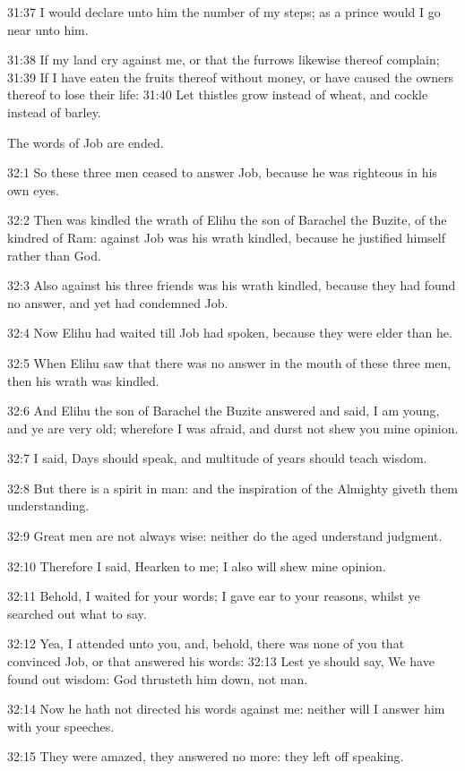 31:37 I would declare unto him the number of my steps; as a prince
would I go near unto him.

31:38 If my land cry against me, or that the furrows likewise thereof
complain; 31:39 If I have eaten the fruits thereof without money, or
have caused the owners thereof to lose their life: 31:40 Let thistles
grow instead of wheat, and cockle instead of barley.

The words of Job are ended.

32:1 So these three men ceased to answer Job, because he was righteous
in his own eyes.

32:2 Then was kindled the wrath of Elihu the son of Barachel the
Buzite, of the kindred of Ram: against Job was his wrath kindled,
because he justified himself rather than God.

32:3 Also against his three friends was his wrath kindled, because
they had found no answer, and yet had condemned Job.

32:4 Now Elihu had waited till Job had spoken, because they were elder
than he.

32:5 When Elihu saw that there was no answer in the mouth of these
three men, then his wrath was kindled.

32:6 And Elihu the son of Barachel the Buzite answered and said, I am
young, and ye are very old; wherefore I was afraid, and durst not shew
you mine opinion.

32:7 I said, Days should speak, and multitude of years should teach
wisdom.

32:8 But there is a spirit in man: and the inspiration of the Almighty
giveth them understanding.

32:9 Great men are not always wise: neither do the aged understand
judgment.

32:10 Therefore I said, Hearken to me; I also will shew mine opinion.

32:11 Behold, I waited for your words; I gave ear to your reasons,
whilst ye searched out what to say.

32:12 Yea, I attended unto you, and, behold, there was none of you
that convinced Job, or that answered his words: 32:13 Lest ye should
say, We have found out wisdom: God thrusteth him down, not man.

32:14 Now he hath not directed his words against me: neither will I
answer him with your speeches.

32:15 They were amazed, they answered no more: they left off speaking.

